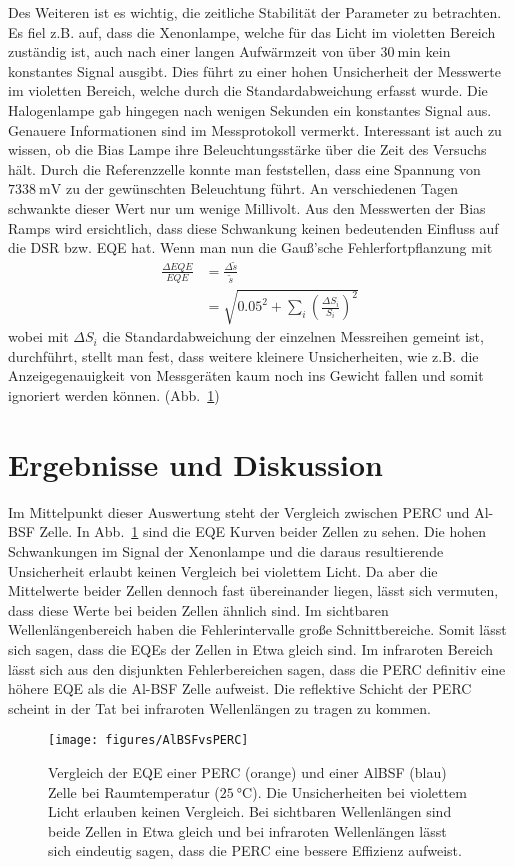 \documentclass[ngerman, twocolumn]{scrartcl}
\begin{document}
Des Weiteren ist es wichtig, die zeitliche Stabilität der Parameter zu betrachten. Es fiel z.B. auf, dass die Xenonlampe, welche für das Licht im violetten Bereich zuständig ist, auch nach einer langen Aufwärmzeit von über $\SI{30}{\minute}$ kein konstantes Signal ausgibt. Dies führt zu einer hohen Unsicherheit der Messwerte im violetten Bereich, welche durch die Standardabweichung erfasst wurde. Die Halogenlampe gab hingegen nach wenigen Sekunden ein konstantes Signal aus. Genauere Informationen sind im Messprotokoll vermerkt. Interessant ist auch zu wissen, ob die Bias Lampe ihre Beleuchtungsstärke über die Zeit des Versuchs hält. Durch die Referenzzelle konnte man feststellen, dass eine Spannung von $\SI{7338}{\milli\volt}$ zu der gewünschten Beleuchtung führt. An verschiedenen Tagen schwankte dieser Wert nur um wenige Millivolt. Aus den Messwerten der Bias Ramps wird ersichtlich, dass diese Schwankung keinen bedeutenden Einfluss auf die DSR bzw. EQE hat. Wenn man nun die Gauß'sche Fehlerfortpflanzung mit
\begin{align}
\frac{\Delta EQE}{EQE} &= \frac{\Delta\tilde{s}}{\tilde{s}} \\
&= \sqrt{ \num{0.05}^2 + \sum_i \left( \frac{\Delta S_i}{S_i} \right)^2 }
\end{align}
wobei mit $\Delta S_i$ die Standardabweichung der einzelnen Messreihen gemeint ist, durchführt, stellt man fest, dass weitere kleinere Unsicherheiten, wie z.B. die Anzeigegenauigkeit von Messgeräten kaum noch ins Gewicht fallen und somit ignoriert werden können. (Abb.~\ref{fig:AlBSFvsPERC})

\section{Ergebnisse und Diskussion}
Im Mittelpunkt dieser Auswertung steht der Vergleich zwischen PERC und Al-BSF Zelle. In Abb.~\ref{fig:AlBSFvsPERC} sind die EQE Kurven beider Zellen zu sehen. Die hohen Schwankungen im Signal der Xenonlampe und die daraus resultierende Unsicherheit erlaubt keinen Vergleich bei violettem Licht. Da aber die Mittelwerte beider Zellen dennoch fast übereinander liegen, lässt sich vermuten, dass diese Werte bei beiden Zellen ähnlich sind. Im sichtbaren Wellenlängenbereich haben die Fehlerintervalle große Schnittbereiche. Somit lässt sich sagen, dass die EQEs der Zellen in Etwa gleich sind. Im infraroten Bereich lässt sich aus den disjunkten Fehlerbereichen sagen, dass die PERC definitiv eine höhere EQE als die Al-BSF Zelle aufweist. Die reflektive Schicht der PERC scheint in der Tat bei infraroten Wellenlängen zu tragen zu kommen.

\begin{figure}
\texttt{[image: figures/AlBSFvsPERC]}
\caption{Vergleich der EQE einer PERC (orange) und einer AlBSF (blau) Zelle bei Raumtemperatur ($\SI{25}{\celsius}$). Die Unsicherheiten bei violettem Licht erlauben keinen Vergleich. Bei sichtbaren Wellenlängen sind beide Zellen in Etwa gleich und bei infraroten Wellenlängen lässt sich eindeutig sagen, dass die PERC eine bessere Effizienz aufweist.}
\label{fig:AlBSFvsPERC}
\end{figure}
\end{document}
